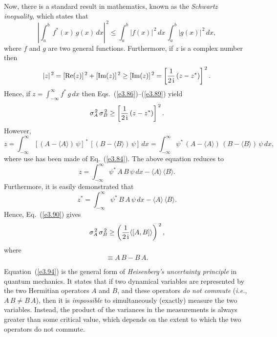 Now, there is a standard result in mathematics, known as the
{\em Schwartz inequality}, which states that
\begin{equation}
\left|\int_a^b\,f^\ast(x)\,g(x)\,dx\right|^{\,2}\leq \int_a^b|f(x)|^{\,2}\,dx\,\int_a^b |g(x)|^{\,2}\,dx,
\end{equation}
where $f$ and $g$ are two general functions. Furthermore, if $z$ is
a complex number then
\begin{equation}\label{e3.89}
|z|^{\,2} = [{\rm Re}(z)]^{\,2} + [{\rm Im}(z)]^{\,2} \geq [{\rm Im}(z)]^{\,2} = \left[\frac{1}{2\,{\rm i}}\,(z-z^\ast)\right]^{\,2}.
\end{equation}
Hence, if $z=\int_{-\infty}^\infty f^\ast\,g\,dx$ then Eqs.~(\ref{e3.86})--(\ref{e3.89}) yield
\begin{equation}\label{e3.90}
\sigma_A^{\,2}\,\sigma_B^{\,2} \geq \left[\frac{1}{2\,{\rm i}}\,(z-z^\ast)\right]^{\,2}.
\end{equation}
However,
\begin{equation}
z = \int_{-\infty}^{\infty} [(A-\langle A\rangle)\,\psi]^{\,\ast}\,[(B-\langle B\rangle)\,\psi]\,dx = \int_{-\infty}^{\infty} \psi^\ast\,(A-\langle A\rangle)\,(B-\langle B\rangle)\,\psi\,dx,
\end{equation}
where use has been made of Eq.~(\ref{e3.84}). The above
equation reduces to
\begin{equation}
z =\int_{-\infty}^\infty \psi^\ast\,A\,B\,\psi\,dx -\langle A\rangle\,\langle B\rangle.
\end{equation}
Furthermore, it is easily demonstrated that
\begin{equation}
z ^\ast=\int_{-\infty}^\infty \psi^\ast\,B\,A\,\psi\,dx -\langle A\rangle\,\langle B\rangle.
\end{equation}
Hence, Eq.~(\ref{e3.90}) gives
\begin{equation}\label{e3.94}
\sigma_A^{\,2}\,\sigma_B^{\,2} \geq \left(\frac{1}{2\,{\rm i}}\langle[A,B]\rangle\right)^{\,2},
\end{equation}
where
\begin{equation}
[A,B] \equiv A\,B-B\,A.
\end{equation}

Equation~(\ref{e3.94}) is the general form of  {\em Heisenberg's uncertainty principle}\/ in quantum mechanics. It states that if two dynamical
variables are represented by the two Hermitian operators $A$ and $B$,
and these  operators {\em do not commute}\/ ({\em i.e.}, $A\,B\neq B\,A$),
then it is {\em impossible}\/ to simultaneously (exactly) measure the two variables.
Instead, the product of the variances in the measurements  is always greater than some critical value, which
depends on the extent to which the two operators do not commute.

